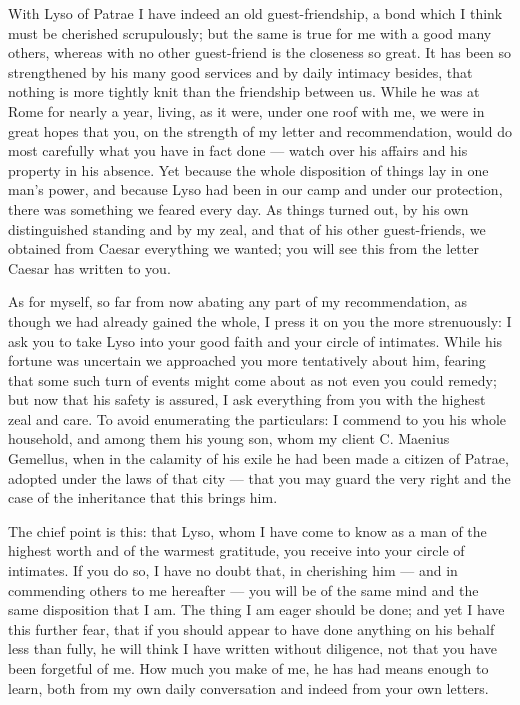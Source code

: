 

 With Lyso of Patrae I have indeed an old guest-friendship, a bond which I think must be cherished scrupulously; but the same is true for me with a good many others, whereas with no other guest-friend is the closeness so great. It has been so strengthened by his many good services and by daily intimacy besides, that nothing is more tightly knit than the friendship between us. While he was at Rome for nearly a year, living, as it were, under one roof with me, we were in great hopes that you, on the strength of my letter and recommendation, would do most carefully what you have in fact done --- watch over his affairs and his property in his absence. Yet because the whole disposition of things lay in one man's power, and because Lyso had been in our camp and under our protection, there was something we feared every day. As things turned out, by his own distinguished standing and by my zeal, and that of his other guest-friends, we obtained from Caesar everything we wanted; you will see this from the letter Caesar has written to you.

 As for myself, so far from now abating any part of my recommendation, as though we had already gained the whole, I press it on you the more strenuously: I ask you to take Lyso into your good faith and your circle of intimates. While his fortune was uncertain we approached you more tentatively about him, fearing that some such turn of events might come about as not even you could remedy; but now that his safety is assured, I ask everything from you with the highest zeal and care. To avoid enumerating the particulars: I commend to you his whole household, and among them his young son, whom my client C. Maenius Gemellus, when in the calamity of his exile he had been made a citizen of Patrae, adopted under the laws of that city --- that you may guard the very right and the case of the inheritance that this brings him.

 The chief point is this: that Lyso, whom I have come to know as a man of the highest worth and of the warmest gratitude, you receive into your circle of intimates. If you do so, I have no doubt that, in cherishing him --- and in commending others to me hereafter --- you will be of the same mind and the same disposition that I am. The thing I am eager should be done; and yet I have this further fear, that if you should appear to have done anything on his behalf less than fully, he will think I have written without diligence, not that you have been forgetful of me. How much you make of me, he has had means enough to learn, both from my own daily conversation and indeed from your own letters.
